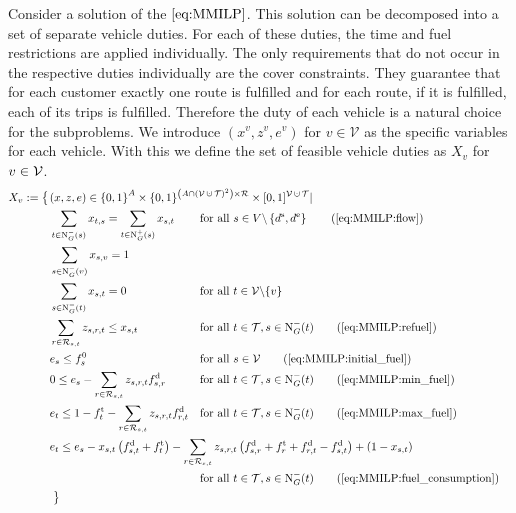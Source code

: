 Consider a solution of the $\eqref{eq:MMILP}$. This solution can be decomposed into a set of separate vehicle duties. For each of these duties, the time and fuel restrictions are applied individually. The only requirements that do not occur in the respective duties individually are the cover constraints. They guarantee that for each customer exactly one route is fulfilled and for each route, if it is fulfilled, each of its trips is fulfilled. Therefore the duty of each vehicle is a natural choice for the subproblems. We introduce $\left(x^v,z^v,e^v\right)$ for $v\in\mathcal{V}$ as the specific variables for each vehicle. With this we define the set of feasible vehicle duties as $X_v$ for $v\in\mathcal{V}$. 
\begin{align}
	X_v := \left\{\vphantom{\{0,1\}^A}\right. & \omit\rlap{$\displaystyle{(x,z,e)\in\left\{0,1\right\}^A \times \{0,1\}^{\left(A\cap\left(\mathcal{V}\cupdot\mathcal{T}\right)^2\right)\times\mathcal{R}} \times [0,1]^{\mathcal{V}\cupdot\mathcal{T}}|}$} \nonumber \\
	& \sum_{t\in\Nin(s)} x_{t,s} = \sum_{t\in\Nout(s)} x_{s,t} && \text{for all } s\in V\backslash\left\{d^{\operatorname{s}},d^{\operatorname{e}}\right\} \tag{\ref{eq:MMILP:flow}} \\
	& \sum_{s\in\Nin(v)} x_{s,v} = 1 \label{eq:Xv:vehicle} \\
	& \sum_{s\in\Nin(t)} x_{s,t} = 0 && \text{for all } t\in\mathcal{V}\backslash\{v\} \label{eq:Xv:other_vehicles} \\
	& \sum_{r\in\Rst} z_{s,r,t} \leq x_{s,t} & & \text{for all } t\in\mathcal{T}, s\in\Nin(t) \tag{\ref{eq:MMILP:refuel}} \\
	& e_s \leq f_s^0 & & \text{for all } s\in\mathcal{V} \tag{\ref{eq:MMILP:initial_fuel}} \\
	& 0 \leq e_s - \sum_{r\in\Rst} z_{s,r,t}\fd_{s,r} & & \text{for all } t\in\mathcal{T}, s\in\Nin(t) \tag{\ref{eq:MMILP:min_fuel}} \\
	& e_t \leq 1 - \ft_t - \sum_{r\in\Rst} z_{s,r,t}\fd_{r,t} & & \text{for all } t\in\mathcal{T}, s\in\Nin(t) \tag{\ref{eq:MMILP:max_fuel}} \\
	& \omit\rlap{$\displaystyle{e_t \leq e_s - x_{s,t}\left(f_{s,t}^{\operatorname{d}}+f_t^{\operatorname{t}}\right) - \sum_{r\in\Rst} z_{s,r,t}\left(\fd_{s,r}+\ft_r+\fd_{r,t}-\fd_{s,t}\right) + \left(1-x_{s,t}\right)}$} \nonumber \\
	& & & \text{for all } t\in\mathcal{T}, s\in\Nin(t) \tag{\ref{eq:MMILP:fuel_consumption}} \\
	& \left. \vphantom{\{0,1\}^A} \right\} \nonumber
\end{align}

